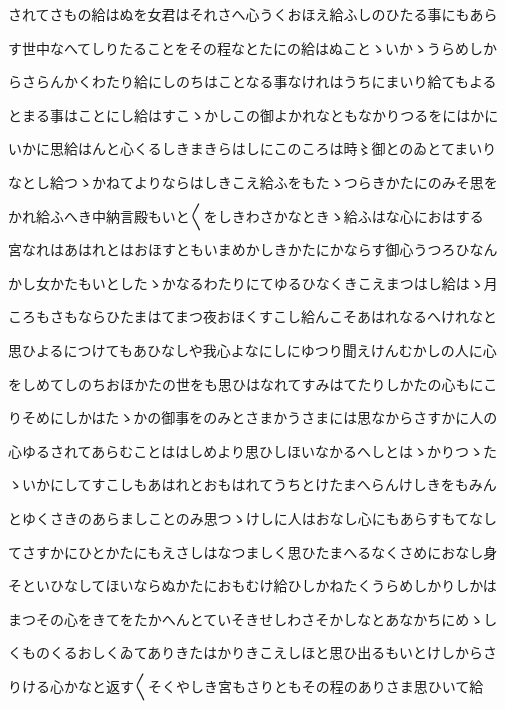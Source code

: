 \documentclass[a4paper,11pt,landscape]{ltjtarticle}
\begin{document}
\par\medskip
されてさもの給はぬを女君はそれさへ心うくおほえ給ふしのひたる事にもあら
\par\medskip
す世中なへてしりたることをその程なとたにの給はぬことゝいかゝうらめしか
\par\medskip
らさらんかくわたり給にしのちはことなる事なけれはうちにまいり給てもよる
\par\medskip
とまる事はことにし給はすこゝかしこの御よかれなともなかりつるをにはかに
\par\medskip
いかに思給はんと心くるしきまきらはしにこのころは時〻御とのゐとてまいり
\par\medskip
なとし給つゝかねてよりならはしきこえ給ふをもたゝつらきかたにのみそ思を
\par\medskip
かれ給ふへき中納言殿もいと〱をしきわさかなときゝ給ふはな心におはする
\par\medskip
宮なれはあはれとはおほすともいまめかしきかたにかならす御心うつろひなん
\par\medskip
かし女かたもいとしたゝかなるわたりにてゆるひなくきこえまつはし給はゝ月
\par\medskip
ころもさもならひたまはてまつ夜おほくすこし給んこそあはれなるへけれなと
\par\medskip
思ひよるにつけてもあひなしや我心よなにしにゆつり聞えけんむかしの人に心
\par\medskip
をしめてしのちおほかたの世をも思ひはなれてすみはてたりしかたの心もにこ
\par\medskip
りそめにしかはたゝかの御事をのみとさまかうさまには思なからさすかに人の
\par\medskip
心ゆるされてあらむことははしめより思ひしほいなかるへしとはゝかりつゝた
\par\medskip
ゝいかにしてすこしもあはれとおもはれてうちとけたまへらんけしきをもみん
\par\medskip
とゆくさきのあらましことのみ思つゝけしに人はおなし心にもあらすもてなし
\par\medskip
てさすかにひとかたにもえさしはなつましく思ひたまへるなくさめにおなし身
\par\medskip
そといひなしてほいならぬかたにおもむけ給ひしかねたくうらめしかりしかは
\par\medskip
まつその心をきてをたかへんとていそきせしわさそかしなとあなかちにめゝし
\par\medskip
くものくるおしくゐてありきたはかりきこえしほと思ひ出るもいとけしからさ
\par\medskip
りける心かなと返す〱そくやしき宮もさりともその程のありさま思ひいて給
\end{document}
